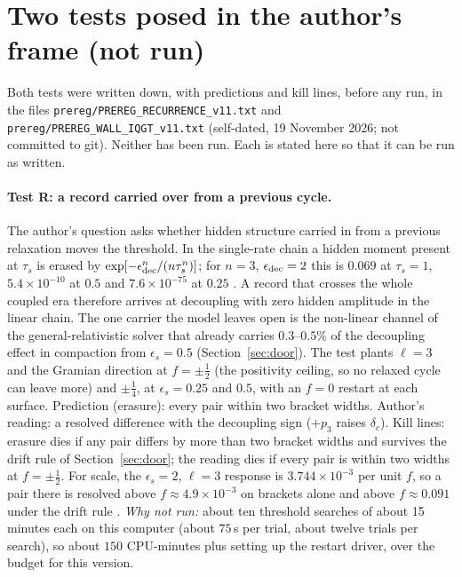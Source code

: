 \section{Two tests posed in the author's frame (not run)}\label{sec:posed}

Both tests were written down, with predictions and kill lines, before any run, in the files \texttt{prereg/PREREG\_RECURRENCE\_v11.txt} and \texttt{prereg/PREREG\_WALL\_IQGT\_v11.txt} (self-dated, 19 November 2026; not committed to git). Neither has been run. Each is stated here so that it can be run as written.

\paragraph{Test R: a record carried over from a previous cycle.} The author's question asks whether hidden structure carried in from a previous relaxation moves the threshold. In the single-rate chain a hidden moment present at $\tau_s$ is erased by $\exp[-\epsilon_{\rm dec}^n/(n\tau_s^n)]$; for $n=3$, $\epsilon_{\rm dec}=2$ this is $0.069$ at $\tau_s=1$, $5.4\times10^{-10}$ at $0.5$ and $7.6\times10^{-75}$ at $0.25$ . A record that crosses the whole coupled era therefore arrives at decoupling with zero hidden amplitude in the linear chain. The one carrier the model leaves open is the non-linear channel of the general-relativistic solver that already carries $0.3$--$0.5\%$ of the decoupling effect in compaction from $\epsilon_s=0.5$ (Section~\ref{sec:door}). The test plants $\ell=3$ and the Gramian direction at $f=\pm\tfrac12$ (the positivity ceiling, so no relaxed cycle can leave more) and $\pm\tfrac14$, at $\epsilon_s=0.25$ and $0.5$, with an $f=0$ restart at each surface. Prediction (erasure): every pair within two bracket widths. Author's reading: a resolved difference with the decoupling sign ($+p_3$ raises $\delta_c$). Kill lines: erasure dies if any pair differs by more than two bracket widths and survives the drift rule of Section~\ref{sec:door}; the reading dies if every pair is within two widths at $f=\pm\tfrac12$. For scale, the $\epsilon_s=2$, $\ell=3$ response is $3.744\times10^{-3}$ per unit $f$, so a pair there is resolved above $f\approx4.9\times10^{-3}$ on brackets alone and above $f\approx0.091$ under the drift rule . \emph{Why not run:} about ten threshold searches of about 15 minutes each on this computer (about $75$\,s per trial, about twelve trials per search), so about $150$ CPU-minutes plus setting up the restart driver, over the budget for this version.

